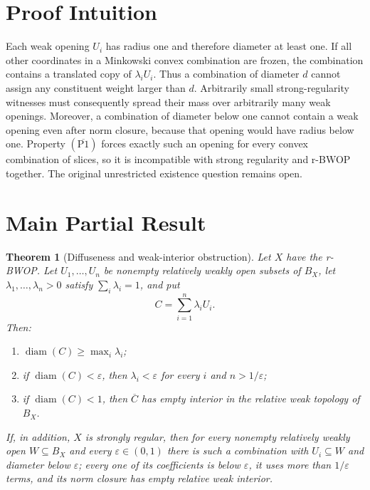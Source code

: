 \documentclass[11pt]{article}
\newtheorem{theorem}{Theorem}
\newcommand{\diameter}{\operatorname{diam}}
\newcommand{\Pbar}{(\overline{\mathrm{P1}})}
\begin{document}
\section*{Proof Intuition}

Each weak opening $U_i$ has radius one and therefore diameter at least one.
If all other coordinates in a Minkowski convex combination are frozen, the
combination contains a translated copy of $\lambda_iU_i$. Thus a combination
of diameter $d$ cannot assign any constituent weight larger than $d$.
Arbitrarily small strong-regularity witnesses must consequently spread their
mass over arbitrarily many weak openings. Moreover, a combination of diameter
below one cannot contain a weak opening even after norm closure, because that
opening would have radius below one. Property $\Pbar$ forces exactly such an
opening for every convex combination of slices, so it is incompatible with
strong regularity and r-BWOP together. The original unrestricted existence
question remains open.

\section*{Main Partial Result}

\begin{theorem}[Diffuseness and weak-interior obstruction]\label{thm:main}
Let $X$ have the r-BWOP. Let $U_1,\ldots,U_n$ be nonempty relatively weakly
open subsets of $B_X$, let $\lambda_1,\ldots,\lambda_n>0$ satisfy
$\sum_i\lambda_i=1$, and put
\[
 C=\sum_{i=1}^n\lambda_iU_i.
\]
Then:
\begin{enumerate}[label=\textup{(\roman*)}]
\item $\diameter(C)\geq\max_i\lambda_i$;
\item if $\diameter(C)<\varepsilon$, then
      $\lambda_i<\varepsilon$ for every $i$ and $n>1/\varepsilon$;
\item if $\diameter(C)<1$, then $\overline C$ has empty interior in the
      relative weak topology of $B_X$.
\end{enumerate}

If, in addition, $X$ is strongly regular, then for every nonempty relatively
weakly open $W\subseteq B_X$ and every $\varepsilon\in(0,1)$ there is such a
combination with $U_i\subseteq W$ and diameter below $\varepsilon$; every one
of its coefficients is below $\varepsilon$, it uses more than
$1/\varepsilon$ terms, and its norm closure has empty relative weak interior.
\end{theorem}
\end{document}
